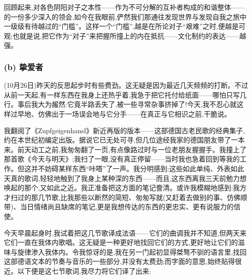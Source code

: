 回顾起来,对各色阴阳对子之本性——作为不可分解的互补者构成的和谐整体——的一份多少深入的领会,如今在我眼前,俨然我们那通往发现世界与发现自我之旅中一级级有待越过的“门槛”。这样一个“门槛”,越是在所论对子“艰难”之时,便越是可观;也就是说,把它作为“对子”来把握所撞上的内在抵抗——文化制约的表达——越强。

\subsubsection*{(b) 挚爱者}
\label{ch18:local:h18}

\label{ch18:local:n16}

(10月26日)昨天的反思起步时有些费劲。这无疑是因为最近几天频频的打断。不过从前一天起,有一样东西在我身上还热乎着,我急于把它托付给纸面——哪怕只写几行。事后我大为赧然:它竟半路丢失了,被一些寻常杂事挤掉了!今天,我不忍心就这样过早地、仿佛出于一场误会地与它分手——在真正与它相识之前,干脆说。

我翻阅了《Zupfgeigenhansl》新近再版的版本——这部德国古老民歌的经典集子,约在本世纪初编定出版。据说它已无处可寻,但几位途经我家的德国朋友\dmark{}带了一本来。前天动工之前,我匆匆翻了一页,有点像路过时与一位老朋友握握手。我撞上了那首歌《今天与明天》;我扫了一眼,没有真正停留——当时我也急着回到等我的工作。但这并不妨碍某样东西“咔嗒”了一声。我分明感到:这些如此单纯、外表如此天真的歌词,轻轻地触到了我身上某种深的东西——而且,这东西离我三天前勉力想唤起的那个,又如此之近。我正准备把这方面的笔记誊清。或许我模糊地感到:我方才扫过的那几节歌,比我那些以断然的简短、匆匆写就(又赶着去做别的事、仿佛顺带)、当日情绪尚且缺席的笔记,更是我想传达的东西的更忠实、更有说服力的信使。

今天早晨起身时,我试着把这几节歌译成法语——它们的曲调我并不知道,但两天来它们一直在我体内歌唱。这无疑是一种更好地找回它们的方式,更好地让它们的滋味与旋律渗入我体内。令我惊讶的是,我在另一门起初显得桀骜不驯的语言里,找回这部德语文本的节奏与音乐的一些部分,并没有太费劲;而字面的意思,始终贴得很近。以下便是这七节歌词,我尽力将它们译了出来:

